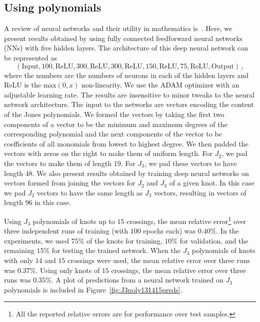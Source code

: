 \documentclass[11pt]{article}
\begin{document}
\subsection{Using polynomials}
A review of neural networks and their utility in mathematics is~\cite{williamson2024deep}.
Here, we present results obtained by using fully connected feedforward neural networks (NNs) with five hidden layers.
The architecture of this deep neural network can be represented as%
\[
    (\text{Input},100,\text{ReLU}, 300,\text{ReLU},300,\text{ReLU},150,\text{ReLU},75,\text{ReLU},\text{Output}) \, ,
\]
where the numbers are the numbers of neurons in each of the hidden layers and ReLU is the $\text{max}(0,x)$ non-linearity.
We use the ADAM optimizer with an adjustable learning rate.
The results are insensitive to minor tweaks to the neural network architecture.
The input to the networks are vectors encoding the content of the Jones polynomials.
We formed the vectors by taking the first two components of a vector to be the minimum and maximum degrees of the corresponding polynomial and the next components of the vector to be coefficients of all monomials from lowest to highest degree.
We then padded the vectors with zeros on the right to make them of uniform length.
For $J_2$, we pad the vectors to make them of length $19$.
For $J_3$, we pad these vectors to have length $48$.
We also present results obtained by training deep neural networks on vectors formed from joining the vectors for $J_2$ and $J_3$ of a given knot.
In this case we pad $J_2$ vectors to have the same length as $J_3$ vectors, resulting in vectors of length $96$ in this case.

Using $J_3$ polynomials of knots up to $15$ crossings, the mean relative error\footnote{All the reported relative errors are for performance over test samples.} over three independent runs of training (with $100$ epochs each) was $0.40\%$.
In the experiments, we used $75\%$ of the knots for training, $10\%$ for validation, and the remaining $15\%$ for testing the trained network.
When the $J_3$ polynomials of knots with only $14$ and $15$ crossings were used, the mean relative error over three runs was $0.37\%$.
Using only knots of $15$ crossings, the mean relative error over three runs was $0.35\%$.
A plot of predictions from a neural network trained on $J_3$ polynomials is included in Figure~\ref{fig:J3poly131415preds}.
\end{document}
